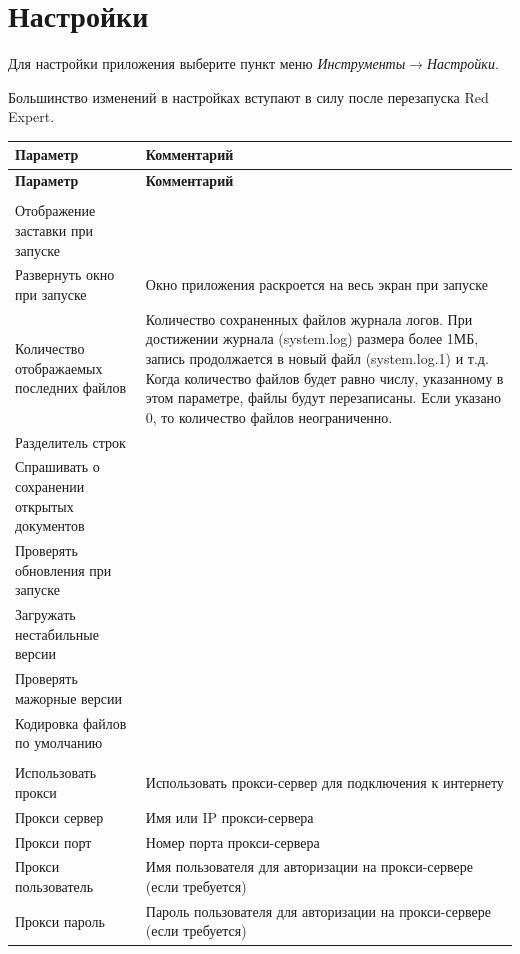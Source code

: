 \section{Настройки}
Для настройки приложения выберите пункт меню \textit{Инструменты}$\rightarrow$\textit{Настройки}.
\begin{redremark}
	Большинство изменений в настройках вступают в силу после перезапуска Red Expert.
\end{redremark}
\begin{longtable}[r]{|>{\ttfamily}m{6cm}|m{9cm}|}
	\hline
	\centering\normalfont\bfseries Параметр &
	\centering\arraybslash\bfseries Комментарий\\\hline
	\endfirsthead
	\hline
	\centering\normalfont\bfseries Параметр &
	\centering\arraybslash\bfseries Комментарий\\\hline
	\endhead
	\rowcolor[gray]{.9}\multicolumn{2}{|m{15.25cm}|}{\bfseries Общие}\\\hline 
	Отображение заставки при запуске
	&  \\\hline
	Развернуть окно при запуске 
	& Окно приложения раскроется на весь экран при запуске\\\hline
	Количество отображаемых последних файлов
	& Количество сохраненных файлов журнала логов. При достижении журнала (system.log) размера более 1МБ, запись продолжается в новый файл (system.log.1) и т.д. Когда количество файлов будет равно числу, указанному в этом параметре, файлы будут перезаписаны. Если указано 0, то количество файлов неограниченно. \\\hline
	Разделитель строк
	&  \\\hline
	Спрашивать о сохранении открытых документов
	&  \\\hline
	Проверять обновления при запуске
	& \\\hline
	Загружать нестабильные версии
	&  \\\hline 
	Проверять мажорные версии
	&  \\\hline
	Кодировка файлов по умолчанию
	&   \\\hline
	\rowcolor[gray]{.9}\multicolumn{2}{|m{15.25cm}|}{\bfseries Настройка прокси}\\\hline 
	Использовать прокси 
	&  Использовать прокси-сервер для подключения к интернету \\\hline
	Прокси сервер
	&  Имя или IP прокси-сервера \\\hline
	Прокси порт
	& Номер порта прокси-сервера \\\hline 
	Прокси пользователь
	&  Имя пользователя для авторизации на прокси-сервере (если требуется)\\\hline
	Прокси пароль
	& Пароль пользователя для авторизации на прокси-сервере (если требуется)\\\hline  
\end{longtable} 

